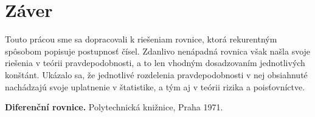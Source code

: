 \documentclass[a4paper,10pt]{article}
\theoremstyle{plain}
\theoremstyle{definition}
\begin{document}
\section{Záver}
Touto  prácou sme sa dopracovali k riešeniam rovnice, ktorá rekurentným spôsobom popisuje postupnosť čísel. Zdanlivo nenápadná rovnica však našla svoje riešenia v teórii pravdepodobnosti, a to len vhodným dosadzovaním jednotlivých konštánt. Ukázalo sa, že jednotlivé rozdelenia pravdepodobnosti v nej obsiahnuté nachádzajú svoje uplatnenie v štatistike, a tým aj v teórii rizika a poisťovníctve.



\begin{thebibliography}{9}
               {\bf Diferenční rovnice.}
           Polytechnická knižnice, Praha 1971.
\end{thebibliography}
\end{document}
